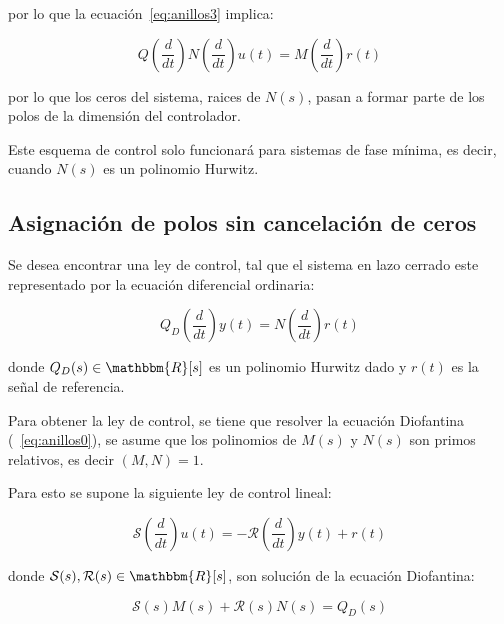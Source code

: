             por lo que la ecuación~\ref{eq:anillos3} implica:

            \begin{equation}
                Q \left( \frac{d}{dt} \right) N \left( \frac{d}{dt} \right) u(t) = M \left( \frac{d}{dt} \right) r(t)
            \end{equation}

            por lo que los ceros del sistema, raices de $N(s)$, pasan a formar parte de los polos de la dimensión del controlador.

            Este esquema de control solo funcionará para sistemas de fase mínima, es decir, cuando $N(s)$ es un polinomio Hurwitz.


            \subsection{Asignación de polos sin cancelación de ceros}

            Se desea encontrar una ley de control, tal que el sistema en lazo cerrado este representado por la ecuación diferencial ordinaria:

            \begin{equation}
                Q_D \left( \frac{d}{dt} \right) y(t) = N \left( \frac{d}{dt} \right) r(t)
            \end{equation}

            donde $Q_D(s) \in \mathbbm{R}[s]$ es un polinomio Hurwitz dado y $r(t)$ es la señal de referencia.

            Para obtener la ley de control, se tiene que resolver la ecuación Diofantina (~\ref{eq:anillos0}), se asume que los polinomios de $M(s)$ y $N(s)$ son primos relativos, es decir $(M, N) = 1$.

            Para esto se supone la siguiente ley de control lineal:

            \begin{equation} \label{eq:anillos4}
                \mathcal{S} \left( \frac{d}{dt} \right) u(t) = - \mathcal{R} \left( \frac{d}{dt} \right) y(t) + r(t)
            \end{equation}

            donde $\mathcal{S}(s), \mathcal{R}(s) \in \mathbbm{R}[s]$, son solución de la ecuación Diofantina:

            \begin{equation} \label{eq:anillos5}
                \mathcal{S}(s) M(s) + \mathcal{R}(s) N(s) = Q_D(s)
            \end{equation}

